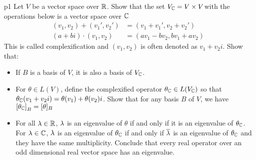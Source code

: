 \documentclass[a4paper, 11pt]{article}
\begin{document}
\begin{problem}{%
	}{p1%
	}
	Let $V$ be a vector space over $\mathbb{R}$. Show that the set $V_{\mathbb{C}}=V\times V$with the operations below is a vector space over $\mathbb{C}$ \begin{align*}
		(v_1,v_2)+(v_1',v_2')&= (v_1+v_1',v_2+v_2')\\
		(a+bi)\cdot (v_1,v_2)&=(av_1-bv_2,bv_1+av_2)
	\end{align*}
	This is called complexification and $(v_1,v_2)$ is often denoted as $v_1+v_2i$. Show that:\begin{itemize}[label=$\bullet$]
		\item If $B$ is a basis of $V$, it is also a basis of $V_{\mathbb{C}}$.
		\item For $\theta\in L(V)$, define the complexified operator $\theta_{\mathbb{C}}\in L(V_{\mathbb{C}})$ so that $\theta_{\mathbb{C}}(v_1+v_2i)=\theta(v_1)+\theta(v_2)i$. Show that for any basis $B$ of $V$, we have $\left[\theta_{\mathbb{C}}\right]_B=[\theta]_B$
		\item For all $\lambda\in\mathbb{R}$, $\lambda$ is an eigenvalue of $\theta$ if and only if it is an eigenvalue of $\theta_{\mathbb{C}}$. For $\lambda\in\mathbb{C}$, $\lambda$ is an eigenvalue of $\theta_{\mathbb{C}}$ if and only if $\overline{\lambda}$ is an eigenvalue of $\theta_{\mathbb{C}}$ and they have the same multiplicity. Conclude that every real operator over an odd dimensional real vector space has an eigenvalue.
	\end{itemize}
\end{problem}
\end{document}
